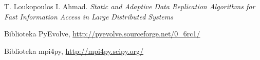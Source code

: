 \documentclass[11pt,pdftex,a4paper]{scrartcl}
\begin{document}
\begin{thebibliography}{}

  T. Loukopoulos I. Ahmad.
  \emph{Static and Adaptive Data Replication Algorithms for Fast Information Access in 
    Large Distributed Systems}

  Biblioteka PyEvolve,
  \url{http://pyevolve.sourceforge.net/0_6rc1/}

  Biblioteka mpi4py,
  \url{http://mpi4py.scipy.org/}

\end{thebibliography}
\end{document}
